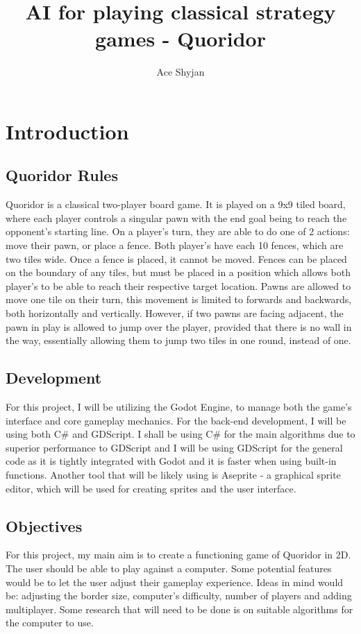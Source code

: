 \documentclass[review]{cmpreport}
\title{AI for playing classical strategy games - Quoridor}
\author{Ace Shyjan}
\begin{document}
	
	\section{Introduction}
	
	\subsection{Quoridor Rules}
	Quoridor is a classical two-player board game. It is played on a 9x9 tiled board, where each player controls a singular pawn with the end goal being to reach the opponent's starting line. On a player's turn, they are able to do one of 2 actions: move their pawn, or place a fence. Both player's have each 10 fences, which are two tiles wide. Once a fence is placed, it cannot be moved. Fences can be placed on the boundary of any tiles, but must be placed in a position which allows both player's to be able to reach their respective target location. Pawns are allowed to move one tile on their turn, this movement is limited to forwards and backwards, both horizontally and vertically. However, if two pawns are facing adjacent, the pawn in play is allowed to jump over the player, provided that there is no wall in the way, essentially allowing them to jump two tiles in one round, instead of one. 
	
	\subsection{Development}
	For this project, I will be utilizing the Godot Engine, to manage both the game's interface and core gameplay mechanics. For the back-end development, I will be using both C\# and GDScript. I shall be using C\# for the main algorithms due to superior performance to GDScript and I will be using GDScript for the general code as it is tightly integrated with Godot and it is faster when using built-in functions. Another tool that will be likely using is Aseprite - a graphical sprite editor, which will be used for creating sprites and the user interface.
	
	\subsection{Objectives}
	For this project, my main aim is to create a functioning game of Quoridor in 2D. The user should be able to play against a computer. Some potential features would be to let the user adjust their gameplay experience. Ideas in mind would be: adjusting the border size, computer's difficulty, number of players and adding multiplayer. Some research that will need to be done is on suitable algorithms for the computer to use.
	
\end{document}
